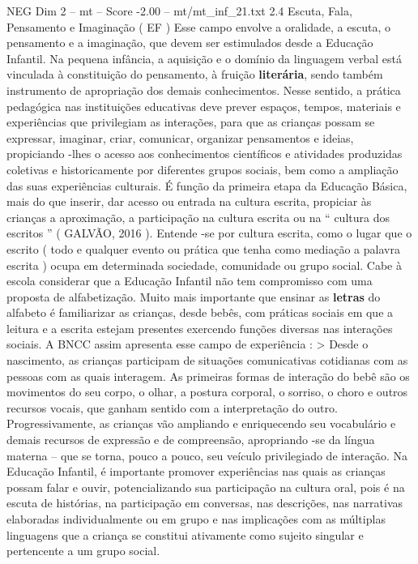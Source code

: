 \begin{textsample}{NEG Dim 2 – mt – Score -2.00 – mt/mt\_inf\_21.txt}  \label{ex:f2_neg_066}
2.4 Escuta, Fala, Pensamento e Imaginação ( EF ) Esse campo envolve a oralidade, a escuta, o pensamento e a imaginação, que devem ser estimulados desde a Educação Infantil.
Na pequena infância, a aquisição e o domínio da linguagem verbal está vinculada à constituição do pensamento, à fruição \textbf{literária}, sendo também instrumento de apropriação dos demais conhecimentos.
Nesse sentido, a prática pedagógica nas instituições educativas deve prever espaços, tempos, materiais e experiências que privilegiam as interações, para que as crianças possam se expressar, imaginar, criar, comunicar, organizar pensamentos e ideias, propiciando -lhes o acesso aos conhecimentos científicos e atividades produzidas coletivas e historicamente por diferentes grupos sociais, bem como a ampliação das suas experiências culturais.
É função da primeira etapa da Educação Básica, mais do que inserir, dar acesso ou entrada na cultura escrita, propiciar às crianças a aproximação, a participação na cultura escrita ou na “ cultura dos escritos ” ( GALVÃO, 2016 ).
Entende -se por cultura escrita, como o lugar que o escrito ( todo e qualquer evento ou prática que tenha como mediação a palavra escrita ) ocupa em determinada sociedade, comunidade ou grupo social.
Cabe à escola considerar que a Educação Infantil não tem compromisso com uma proposta de alfabetização.
Muito mais importante que ensinar as \textbf{letras} do alfabeto é familiarizar as crianças, desde bebês, com práticas sociais em que a leitura e a escrita estejam presentes exercendo funções diversas nas interações sociais.
A BNCC assim apresenta esse campo de experiência : > Desde o nascimento, as crianças participam de situações comunicativas cotidianas com as pessoas com as quais interagem.
As primeiras formas de interação do bebê são os movimentos do seu corpo, o olhar, a postura corporal, o sorriso, o choro e outros recursos vocais, que ganham sentido com a interpretação do outro.
Progressivamente, as crianças vão ampliando e enriquecendo seu vocabulário e demais recursos de expressão e de compreensão, apropriando -se da língua materna – que se torna, pouco a pouco, seu veículo privilegiado de interação.
Na Educação Infantil, é importante promover experiências nas quais as crianças possam falar e ouvir, potencializando sua participação na cultura oral, pois é na escuta de histórias, na participação em conversas, nas descrições, nas narrativas elaboradas individualmente ou em grupo e nas implicações com as múltiplas linguagens que a criança se constitui ativamente como sujeito singular e pertencente a um grupo social.

\end{textsample}
